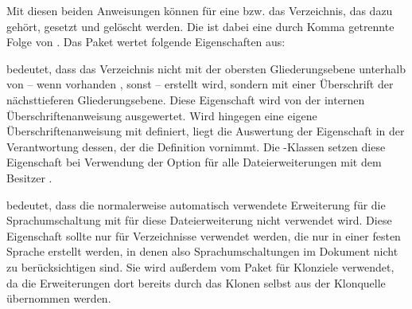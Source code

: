 \begin{Declaration}
\end{Declaration}
Mit diesen beiden Anweisungen können  für eine
 bzw. das Verzeichnis, das dazu gehört, gesetzt und
gelöscht werden. Die  ist dabei eine durch
Komma getrennte Folge von . Das Paket
 wertet folgende Eigenschaften aus:
\begin{description}%
\item[\PValue{leveldown}] bedeutet, dass das Verzeichnis nicht mit der
  obersten Gliederungsebene unterhalb von  -- wenn
  vorhanden , sonst 
  -- erstellt wird, sondern mit einer Überschrift der nächsttieferen
  Gliederungsebene. Diese Eigenschaft wird von der internen
  Überschriftenanweisung ausgewertet. Wird  hingegen eine
  eigene Überschriftenanweisung mit 
  definiert, liegt die Auswertung der Eigenschaft in der Verantwortung dessen,
  der die Definition vornimmt. Die \KOMAScript-Klassen setzen diese
  Eigenschaft bei Verwendung der Option
   für alle Dateierweiterungen mit
  dem Besitzer .
\item[\PValue{nobabel}] bedeutet, dass die normalerweise automatisch
  verwendete Erweiterung für die Sprachumschaltung mit
   für diese Dateierweiterung nicht
  verwendet wird. Diese Eigenschaft sollte nur für Verzeichnisse verwendet
  werden, die nur in einer festen Sprache erstellt werden, in denen also
  Sprachumschaltungen im Dokument nicht zu berücksichtigen sind. Sie wird
  außerdem vom Paket
   für
  Klonziele verwendet, da die Erweiterungen dort bereits durch das Klonen
  selbst aus der Klonquelle übernommen werden.


\end{description}
